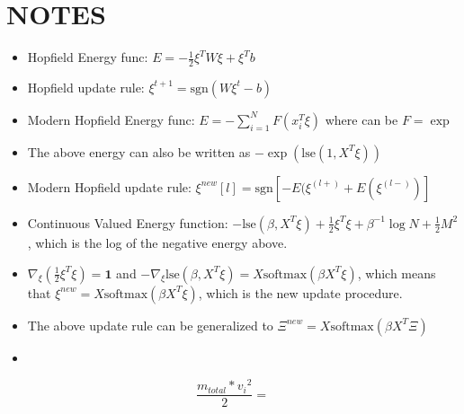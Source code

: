 \documentclass[letterpaper, 12pt]{article}
\begin{document}
\section*{NOTES}
\begin{itemize}
    \item Hopfield Energy func: $E = -\frac 1 2 \xi^TW\xi+\xi^Tb$
    \item Hopfield update rule: $\xi^{t+1}=\text{sgn}(W\xi^t-b)$
    \item Modern Hopfield Energy func: $E = -\sum_{i=1}^N F(x_i^T\xi)$ where can be $F = \exp$
    \item The above energy can also be written as $-\exp(\text{lse}(1,X^T\xi))$
    \item Modern Hopfield update rule: $\xi^{new}[l] = \text{sgn}[-E(\xi^{(l+)}+E(\xi^{(l-)})]$
    \item Continuous Valued Energy function: $-\text{lse}(\beta, X^T\xi) + \frac 1 2\xi^T\xi + \beta^{-1}\log{N} + \frac 1 2  M^2$, which is the log of the negative energy above.
    \item $\nabla_\xi(\frac 1 2 \xi^T\xi) = \bm{1}$ and $-\nabla_\xi\text{lse}(\beta,X^T\xi) = X\text{softmax}(\beta X^T\xi)$, which means that
    $\xi^{new} = X\text{softmax}(\beta X^T\xi)$, which is the new update procedure.
    \item The above update rule can be generalized to $\Xi^{new} = X\text{softmax}(\beta X^T\Xi)$
    \item 
\end{itemize}

\[\frac {m_{total}\ast {v_{i}}^2}{2} = \]
\end{document}
